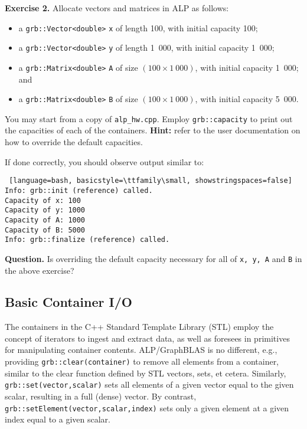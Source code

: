 \noindent \textbf{Exercise 2.} Allocate vectors and matrices in ALP as follows:
\begin{itemize}
  \item a \texttt{grb::Vector<double>} \texttt{x} of length 100, with initial capacity 100;
  \item a \texttt{grb::Vector<double>} \texttt{y} of length 1\ 000, with initial capacity 1\ 000;
  \item a \texttt{grb::Matrix<double>} \texttt{A} of size $(100 \times 1\ 000)$, with initial capacity 1\ 000; and
  \item a \texttt{grb::Matrix<double>} \texttt{B} of size $(100 \times 1\ 000)$, with initial capacity 5\ 000.
\end{itemize}
You may start from a copy of \texttt{alp\_hw.cpp}. Employ \texttt{grb::capacity} to print out the capacities of each of the containers. \textbf{Hint:} refer to the user documentation on how to override the default capacities.

If done correctly, you should observe output similar to:

\begin{lstlisting} [language=bash, basicstyle=\ttfamily\small, showstringspaces=false]
Info: grb::init (reference) called.
Capacity of x: 100
Capacity of y: 1000
Capacity of A: 1000
Capacity of B: 5000
Info: grb::finalize (reference) called.
\end{lstlisting}

\noindent \textbf{Question.} Is overriding the default capacity necessary for all of \texttt{x, y, A} and \texttt{B} in the above exercise?

\subsection{Basic Container I/O}

The containers in the C++ Standard Template Library (STL) employ the concept of iterators to ingest and extract data, as well as foresees in primitives for manipulating container contents.
ALP/GraphBLAS is no different, e.g., providing \texttt{grb::clear(container)} to remove all elements from a container, similar to the clear function defined by STL vectors, sets, et cetera.
Similarly, \texttt{grb::set(vector,scalar)} sets all elements of a given vector equal to the given scalar, resulting in a full (dense) vector.
By contrast, \texttt{grb::setElement(vector,scalar,index)} sets only a given element at a given index equal to a given scalar.

